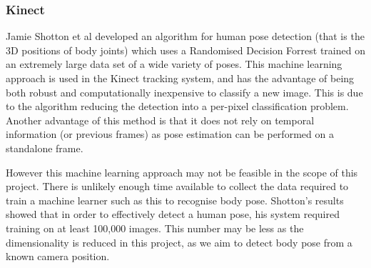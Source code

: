 \subsubsection{Kinect}

Jamie Shotton et al developed an algorithm\cite{shottonkinect} for human pose detection (that is the 3D positions of body joints) which uses a Randomised Decision Forrest trained on an extremely large data set of a wide variety of poses. This machine learning approach is used in the Kinect tracking system, and has the advantage of being both robust and computationally inexpensive to classify a new image. This is due to the algorithm reducing the detection into a per-pixel classification problem. Another advantage of this method is that it does not rely on temporal information (or previous frames) as pose estimation can be performed on a standalone frame.

However this machine learning approach may not be feasible in the scope of this project. There is unlikely enough time available to collect the data required to train a machine learner such as this to recognise body pose. Shotton's results showed that in order to effectively detect a human pose, his system required training on at least 100,000 images\cite{shottonkinect}. This number may be less as the dimensionality is reduced in this project, as we aim to detect body pose from a known camera position.